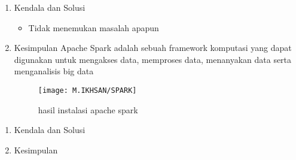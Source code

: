\begin{enumerate}
\item Kendala dan Solusi

\begin{itemize}
\item Tidak menemukan masalah apapun
\end{itemize}

\item Kesimpulan
\newline
Apache Spark adalah sebuah framework komputasi yang dapat digunakan untuk mengakses data, memproses data, menanyakan data serta menganalisis big data

\begin{figure}[!ht]
\texttt{[image: M.IKHSAN/SPARK]}
\caption{hasil instalasi apache spark }
\label{gam:hasil instalasi spark}
\end{figure}
\end{enumerate}

\begin{enumerate}
\item Kendala dan Solusi

\item Kesimpulan

\end{enumerate}